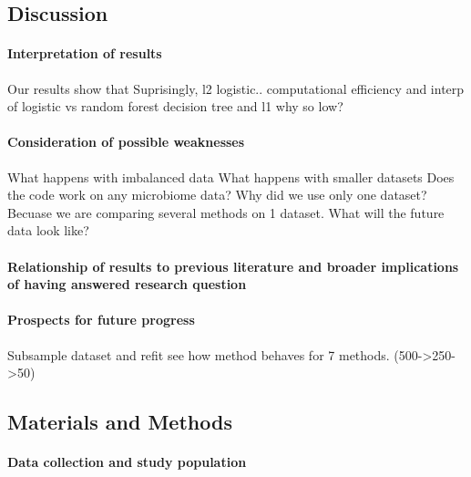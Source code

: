\documentclass[11pt,]{article}
\let\oldparagraph\paragraph
\renewcommand{\paragraph}[1]{\oldparagraph{#1}\mbox{}}
\begin{document}
\subsection{Discussion}\label{discussion}

\paragraph{Interpretation of results}\label{interpretation-of-results}

Our results show that Suprisingly, l2 logistic.. computational
efficiency and interp of logistic vs random forest decision tree and l1
why so low?

\paragraph{Consideration of possible
weaknesses}\label{consideration-of-possible-weaknesses}

What happens with imbalanced data What happens with smaller datasets
Does the code work on any microbiome data? Why did we use only one
dataset? Becuase we are comparing several methods on 1 dataset. What
will the future data look like?

\paragraph{Relationship of results to previous literature and broader
implications of having answered research
question}\label{relationship-of-results-to-previous-literature-and-broader-implications-of-having-answered-research-question}

\paragraph{Prospects for future
progress}\label{prospects-for-future-progress}

Subsample dataset and refit see how method behaves for 7 methods.
(500-\textgreater{}250-\textgreater{}50)

\subsection{Materials and Methods}\label{materials-and-methods}

\paragraph{Data collection and study
population}\label{data-collection-and-study-population}
\end{document}
